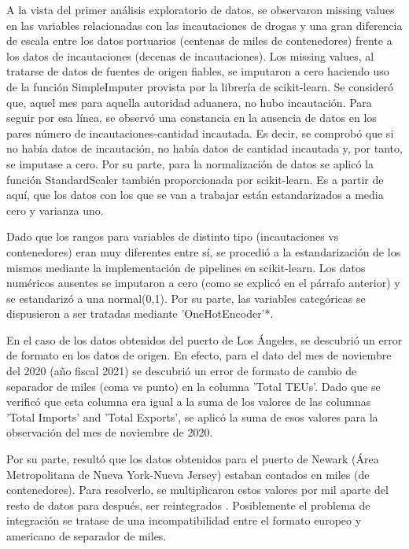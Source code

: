 \documentclass{article}
\begin{document}
		A la vista del primer análisis exploratorio de datos, se observaron missing values en las variables relacionadas con las incautaciones de drogas y una gran diferencia de escala entre los datos portuarios (centenas de miles de contenedores) frente a los datos de incautaciones (decenas de incautaciones). Los missing values, al tratarse de datos de fuentes de origen fiables, se imputaron a cero haciendo uso de la función SimpleImputer provista por la librería de scikit-learn. Se consideró que, aquel mes para aquella autoridad aduanera, no hubo incautación. Para seguir por esa línea, se observó una constancia en la ausencia de datos en los pares número de incautaciones-cantidad incautada. Es decir, se comprobó que si no había datos de incautación, no había datos de cantidad incautada y, por tanto, se imputase a cero. Por su parte, para la normalización de datos se aplicó la función StandardScaler también proporcionada por scikit-learn. Es a partir de aquí, que los datos con los que se van a trabajar están estandarizados a media cero y varianza uno.\
		
		Dado que los rangos para variables de distinto tipo (incautaciones vs contenedores) eran muy diferentes entre sí, se procedió a la estandarización de los mismos mediante la implementación de pipelines en scikit-learn. Los datos numéricos ausentes se imputaron a cero (como se explicó en el párrafo anterior) y se estandarizó a una normal(0,1). Por su parte, las variables categóricas se dispusieron a ser tratadas mediante 'OneHotEncoder'*.\
		
		En el caso de los datos obtenidos del puerto de Los Ángeles, se descubrió un error de formato en los datos de origen. En efecto, para el dato del mes de noviembre del 2020 (año fiscal 2021) se descubrió un error de formato de cambio de separador de miles (coma vs punto) en la columna 'Total TEUs'. Dado que se verificó que esta columna era igual a la suma de los valores de las columnas 'Total Imports' and 'Total Exports', se aplicó la suma de esos valores para la observación del mes de noviembre de 2020.
		
		Por su parte, resultó que los datos obtenidos para el puerto de Newark (Área Metropolitana de Nueva York-Nueva Jersey) estaban contados en miles (de contenedores). Para resolverlo, se multiplicaron estos valores por mil aparte del resto de datos para después, ser reintegrados \cite[]{}. Posiblemente el problema de integración se tratase de una incompatibilidad entre el formato europeo y americano de separador de miles.
		
\end{document}
